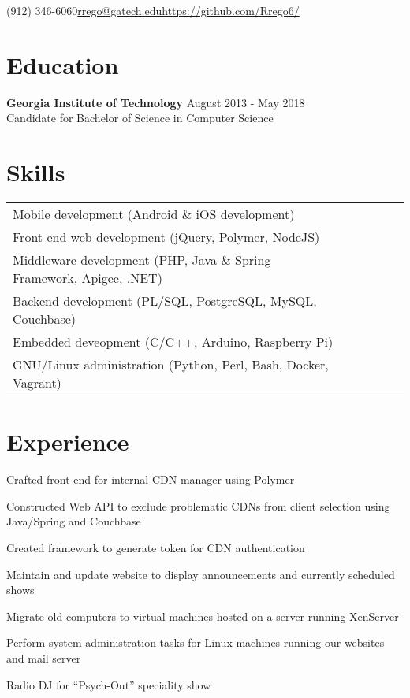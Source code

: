 \documentclass[line]{resume}
\begin{document}
\begin{center}
 {(912) 346-6060}{\href{mailto:rrego@gatech.edu}{rrego@gatech.edu}}{\href{https://github.com/Rrego6/}{https://github.com/Rrego6/}}
\end{center}
\section{Education}
\textbf{Georgia Institute of Technology} \hfill August 2013 - May 2018  \\
Candidate for Bachelor of Science in Computer Science
\section{Skills}
\begin{tabular}{l l l l l l}
	Mobile development (Android \& iOS development) \\
	Front-end web development (jQuery, Polymer, NodeJS) \\
	Middleware development (PHP, Java \& Spring Framework, Apigee, .NET) \\
	Backend development (PL/SQL, PostgreSQL, MySQL, Couchbase) \\
	Embedded deveopment (C/C++, Arduino, Raspberry Pi) \\
	GNU/Linux administration (Python, Perl, Bash, Docker, Vagrant)
\end{tabular}
\section{Experience}
\begin{myitemize}
	\item Crafted front-end for internal CDN manager using Polymer
	\item Constructed Web API to exclude problematic CDNs from client selection using Java/Spring and Couchbase
	\item Created framework to generate token for CDN authentication
\end{myitemize}

\begin{myitemize}
	\item Maintain and update website to display announcements and currently scheduled shows 
	\item Migrate old computers to virtual machines hosted on a server running XenServer 
	\item Perform system administration tasks for Linux machines running our websites and mail server 
	\item Radio DJ for ``Psych-Out'' speciality show
\end{myitemize}
\end{document}

